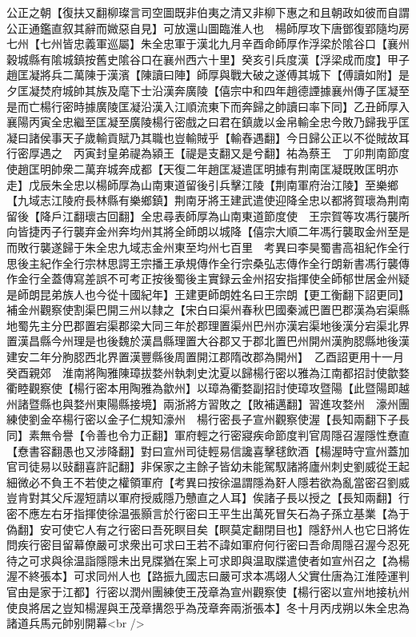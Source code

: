 公正之朝【復扶又翻柳璨言司空圖既非伯夷之清又非柳下惠之和且朝政如彼而自謂公正通鑑直叙其辭而媺惡自見】可放還山圖臨淮人也　楊師厚攻下唐鄧復郢隨均房七州【七州皆忠義軍巡屬】朱全忠軍于漢北九月辛酉命師厚作浮梁於隂谷口【襄州穀城縣有隂城鎮按舊史隂谷口在襄州西六十里】癸亥引兵度漢【浮梁成而度】甲子趙匡凝將兵二萬陳于漢濱【陳讀曰陣】師厚與戰大破之遂傅其城下【傅讀如附】是夕匡凝焚府城帥其族及麾下士沿漢奔廣陵【僖宗中和四年趙德諲據襄州傳子匡凝至是而亡楊行密時據廣陵匡凝沿漢入江順流東下而奔歸之帥讀曰率下同】乙丑師厚入襄陽丙寅全忠繼至匡凝至廣陵楊行密戲之曰君在鎮歲以金帛輸全忠今敗乃歸我乎匡凝曰諸侯事天子歲輸貢賦乃其職也豈輸賊乎【輸舂遇翻】今日歸公正以不從賊故耳行密厚遇之　丙寅封皇弟禔為潁王【禔是支翻又是兮翻】祐為蔡王　丁卯荆南節度使趙匡明帥衆二萬弃城奔成都【天復二年趙匡凝遣匡明據有荆南匡凝既敗匡明亦走】戊辰朱全忠以楊師厚為山南東道留後引兵擊江陵【荆南軍府治江陵】至樂鄉【九域志江陵府長林縣有樂鄉鎮】荆南牙將王建武遣使迎降全忠以都將賀瓌為荆南留後【降戶江翻瓌古回翻】全忠尋表師厚為山南東道節度使　王宗賀等攻馮行襲所向皆捷丙子行襲弃金州奔均州其將全師朗以城降【僖宗大順二年馮行襲取金州至是而敗行襲遂歸于朱全忠九域志金州東至均州七百里　考異曰李昊蜀書高祖紀作全行思後主紀作全行宗林思諤王宗播王承規傳作全行宗桑弘志傳作全行朗新書馮行襲傳作金行全蓋傳寫差誤不可考正按後蜀後主實録云金州招安指揮使全師郁世居金州疑是師朗昆弟族人也今從十國紀年】王建更師朗姓名曰王宗朗【更工衡翻下詔更同】補金州觀察使割渠巴開三州以隸之【宋白曰渠州春秋巴國秦滅巴置巴郡漢為宕渠縣地蜀先主分巴郡置宕渠郡梁大同三年於郡理置渠州巴州亦漢宕渠地後漢分宕渠北界置漢昌縣今州理是也後魏於漢昌縣理置大谷郡又于郡北置巴州開州漢朐䏰縣地後漢建安二年分朐䏰西北界置漢豐縣後周置開江郡隋改郡為開州】　乙酉詔更用十一月癸酉親郊　淮南將陶雅陳璋拔婺州執刺史沈夏以歸楊行密以雅為江南都招討使歙婺衢睦觀察使【楊行密本用陶雅為歙州】以璋為衢婺副招討使璋攻暨陽【此暨陽即越州諸暨縣也與婺州東陽縣接境】兩浙將方習敗之【敗補邁翻】習進攻婺州　濠州團練使劉金卒楊行密以金子仁規知濠州　楊行密長子宣州觀察使渥【長知兩翻下子長同】素無令譽【令善也令力正翻】軍府輕之行密寢疾命節度判官周隱召渥隱性憃直【憃書容翻愚也又涉降翻】對曰宣州司徒輕易信讒喜擊毬飲酒【楊渥時守宣州蓋加官司徒易以䜴翻喜許記翻】非保家之主餘子皆幼未能駕馭諸將廬州刺史劉威從王起細微必不負王不若使之權領軍府【考異曰按徐温謂隱為姧人隱若欲為亂當密召劉威豈肯對其父斥渥短請以軍府授威隱乃戇直之人耳】俟諸子長以授之【長知兩翻】行密不應左右牙指揮使徐温張顥言於行密曰王平生出萬死冒矢石為子孫立基業【為于偽翻】安可使它人有之行密曰吾死瞑目矣【瞑莫定翻閉目也】隱舒州人也它日將佐問疾行密目留幕僚嚴可求衆出可求曰王若不諱如軍府何行密曰吾命周隱召渥今忍死待之可求與徐温詣隱隱未出見牒猶在案上可求即與温取牒遣使者如宣州召之【為楊渥不終張本】可求同州人也【路振九國志曰嚴可求本馮翊人父實仕唐為江淮陸運判官由是家于江都】行密以潤州團練使王茂章為宣州觀察使【楊行密以宣州地接杭州使良將居之豈知楊渥與王茂章搆怨乎為茂章奔兩浙張本】冬十月丙戌朔以朱全忠為諸道兵馬元帥别開幕<br />
